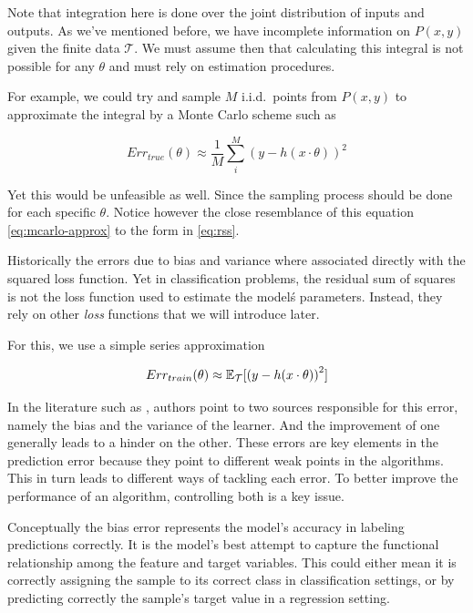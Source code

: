 Note that integration here is done over the joint distribution of inputs and outputs. As we've mentioned before, we have incomplete information on $P(x,y)$ given the finite data $ \mathcal{T}$.
We must assume then that calculating this integral is not possible for any $\theta$ and must rely on estimation procedures.

For example, we could try and sample $M$ i.i.d.\ points from $P(x,y)$ to approximate the integral by a Monte Carlo scheme such as

\begin{equation}\label{eq:mcarlo-approx}
Err_{true}(\theta) \approx \frac{1}{M} \sum_i^M {( y - h(x \cdot \theta) )}^2
\end{equation}

Yet this would be unfeasible as well. Since the sampling process should be done for each specific $\theta$. Notice however the close resemblance of this equation \cref{eq:mcarlo-approx} to the form in \cref{eq:rss}.

Historically the errors due to bias and variance where associated directly with the squared loss function.  Yet in classification problems, the residual sum of squares is not the loss function used to estimate the model\'s parameters. Instead, they rely on other \textit{loss} functions that we will introduce later.

For this, we use a simple series approximation

\begin{equation}
Err_{train}(\theta) \approx  \operatorname{\mathbb{E}}_{ \mathcal{T}}[{(y - h(x \cdot \theta) )}^2]
\end{equation}




In the literature such as \textcite{james-biasVarianceGeneral}, authors point to two sources responsible for this error, namely the bias and the variance of the learner. And the improvement of one generally leads to a hinder on the other. These errors are key elements in the prediction error because they point to different weak points in the algorithms. This in turn leads to different ways of tackling each error. To better improve the performance of an algorithm, controlling both is a key issue.

Conceptually the bias error represents the model's accuracy in labeling predictions correctly. It is the model's best attempt to capture the functional relationship among the feature and target variables. This could either mean it is correctly assigning the sample to its correct class in classification settings, or by predicting correctly the sample's target value in a regression setting.

